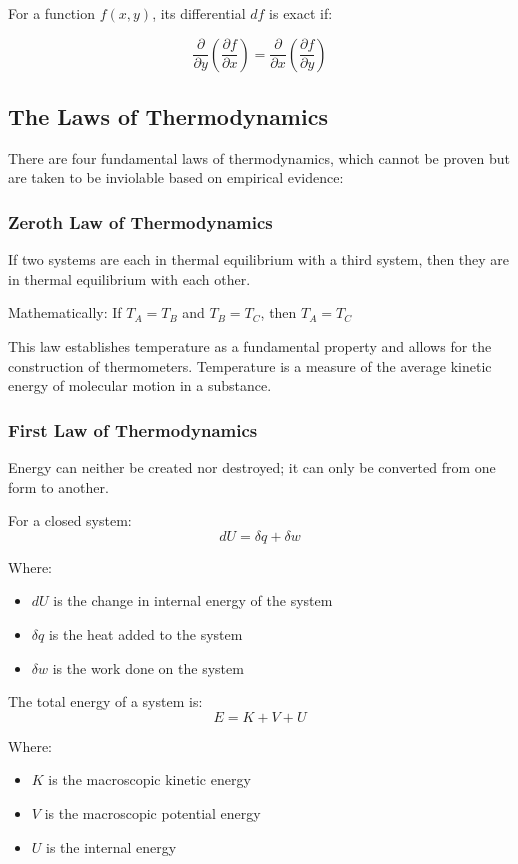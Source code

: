 \documentclass{article}
\theoremstyle{definition}
\begin{document}
For a function $f(x,y)$, its differential $df$ is exact if:

\[
\frac{\partial}{\partial y}\left(\frac{\partial f}{\partial x}\right) = \frac{\partial}{\partial x}\left(\frac{\partial f}{\partial y}\right)
\]

\subsection{The Laws of Thermodynamics}

There are four fundamental laws of thermodynamics, which cannot be proven but are taken to be inviolable based on empirical evidence:

\subsubsection{Zeroth Law of Thermodynamics}

If two systems are each in thermal equilibrium with a third system, then they are in thermal equilibrium with each other.

Mathematically: If $T_A = T_B$ and $T_B = T_C$, then $T_A = T_C$

This law establishes temperature as a fundamental property and allows for the construction of thermometers. Temperature is a measure of the average kinetic energy of molecular motion in a substance.

\subsubsection{First Law of Thermodynamics}

Energy can neither be created nor destroyed; it can only be converted from one form to another.

For a closed system:
\[
dU = \delta q + \delta w
\]

Where:
\begin{itemize}
    \item $dU$ is the change in internal energy of the system
    \item $\delta q$ is the heat added to the system
    \item $\delta w$ is the work done on the system
\end{itemize}

The total energy of a system is:
\[
E = K + V + U
\]

Where:
\begin{itemize}
    \item $K$ is the macroscopic kinetic energy
    \item $V$ is the macroscopic potential energy
    \item $U$ is the internal energy
\end{itemize}
\end{document}
